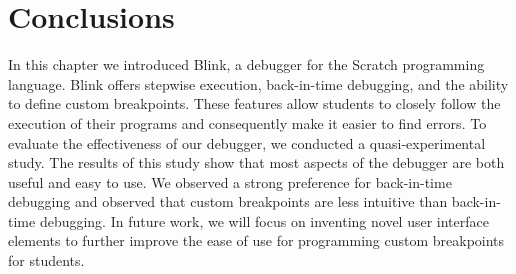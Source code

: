 \documentclass[../main]{subfiles}
\begin{document}
\section{Conclusions}\label{sec:blink-conclusions}
In this chapter we introduced Blink, a debugger for the Scratch programming language.
Blink offers stepwise execution, back-in-time debugging, and the ability to define custom breakpoints.
These features allow students to closely follow the execution of their programs and consequently make it easier to find errors.
To evaluate the effectiveness of our debugger, we conducted a quasi-experimental study.
The results of this study show that most aspects of the debugger are both useful and easy to use.
We observed a strong preference for back-in-time debugging and observed that custom breakpoints are less intuitive than back-in-time debugging.
In future work, we will focus on inventing novel user interface elements to further improve the ease of use for programming custom breakpoints for students.
\end{document}
